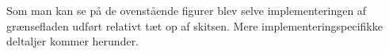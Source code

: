 Som man kan se på de ovenstående figurer blev selve implementeringen af grænsefladen udført relativt tæt op af skitsen. Mere implementeringspecifikke deltaljer kommer herunder.

\newpage




